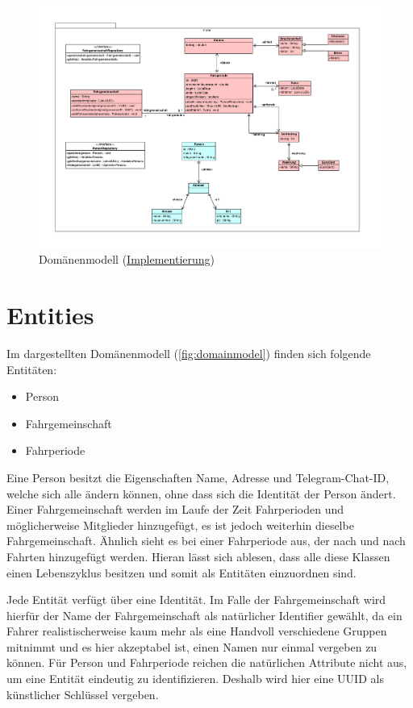 \begin{figure}
    \centering
    \includegraphics[width=1\textwidth, trim = 0cm 0cm 0cm 0cm]{../VPP/Domain Modell.pdf}
    \caption{Domänenmodell (\href{https://github.com/yschiebelhut/carpool-java/tree/27f64a9b6c1e387d7716d38462d01b4b0f8ff42a/3-carpool-java-domain/src/main/java/model}{Implementierung})}
    \label{fig:domainmodel}
\end{figure}

\section{Entities}
Im dargestellten Domänenmodell (\autoref{fig:domainmodel}) finden sich folgende Entitäten:

\begin{itemize}
    \item Person
    \item Fahrgemeinschaft
    \item Fahrperiode
\end{itemize}

Eine Person besitzt die Eigenschaften Name, Adresse und Telegram-Chat-ID, welche sich alle ändern können, ohne dass sich die Identität der Person ändert.
Einer Fahrgemeinschaft werden im Laufe der Zeit Fahrperioden und möglicherweise Mitglieder hinzugefügt, es ist jedoch weiterhin dieselbe Fahrgemeinschaft.
Ähnlich sieht es bei einer Fahrperiode aus, der nach und nach Fahrten hinzugefügt werden.
Hieran lässt sich ablesen, dass alle diese Klassen einen Lebenszyklus besitzen und somit als Entitäten einzuordnen sind.

Jede Entität verfügt über eine Identität.
Im Falle der Fahrgemeinschaft wird hierfür der Name der Fahrgemeinschaft als natürlicher Identifier gewählt, da ein Fahrer realistischerweise kaum mehr als eine Handvoll verschiedene Gruppen mitnimmt und es hier akzeptabel ist, einen Namen nur einmal vergeben zu können.
Für Person und Fahrperiode reichen die natürlichen Attribute nicht aus, um eine Entität eindeutig zu identifizieren.
Deshalb wird hier eine UUID als künstlicher Schlüssel vergeben.

